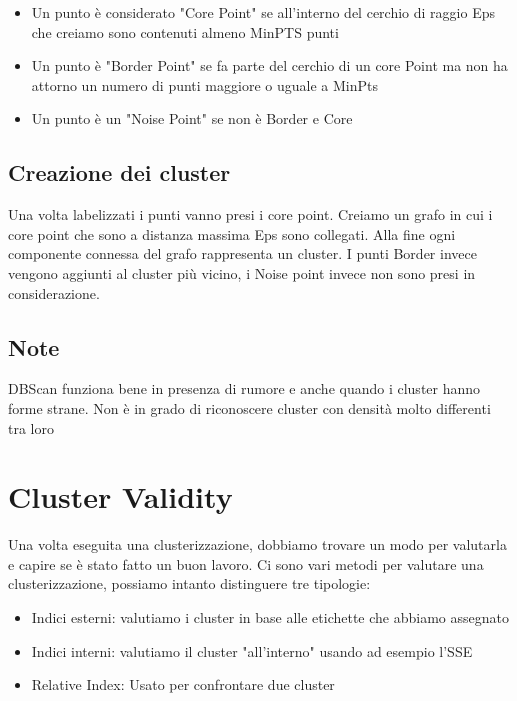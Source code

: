 \documentclass[14pt]{extreport}
\begin{document}
\begin{itemize}
    \item Un punto è considerato "Core Point" se all'interno del cerchio di raggio Eps che creiamo sono contenuti almeno MinPTS punti
    \item Un punto è "Border Point" se fa parte del cerchio di un core Point ma non ha attorno un numero di punti maggiore o uguale a MinPts
    \item Un punto è un "Noise Point" se non è Border e Core
\end{itemize}

\section{Creazione dei cluster}

Una volta labelizzati i punti vanno presi i core point. 
Creiamo un grafo in cui i core point che sono a distanza massima Eps sono collegati.
Alla fine ogni componente connessa del grafo rappresenta un cluster.
I punti Border invece vengono aggiunti al cluster più vicino, i Noise point invece non sono presi in considerazione.


\section{Note}

DBScan funziona bene in presenza di rumore e anche quando i cluster hanno forme strane. 
Non è in grado di riconoscere cluster con densità molto differenti tra loro

\chapter{Cluster Validity}

Una volta eseguita una clusterizzazione, dobbiamo trovare un modo per valutarla e capire se è stato fatto un buon lavoro.
Ci sono vari metodi per valutare una clusterizzazione, possiamo intanto distinguere tre tipologie:

\begin{itemize}
    \item Indici esterni: valutiamo i cluster in base alle etichette che abbiamo assegnato
    \item Indici interni: valutiamo il cluster "all'interno" usando ad esempio l'SSE
    \item Relative Index: Usato per confrontare due cluster
\end{itemize}
\end{document}

